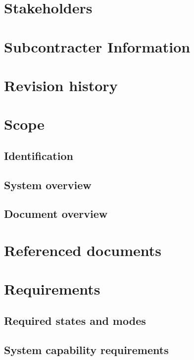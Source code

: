 \documentclass[a4paper, oneside, 11pt]{article}
\begin{document}

\addtolength{\topmargin}{-2cm}
\tableofcontents
\noindent
\section{Stakeholders}

\section{Subcontracter Information}

\section{Revision history}

\section{Scope}
%
\subsection{Identification}

\subsection{System overview}

\subsection{Document overview}

\section{Referenced documents}

\section{Requirements}
%
\subsection{Required states and modes}

\subsection{System capability requirements}

\end{document}

